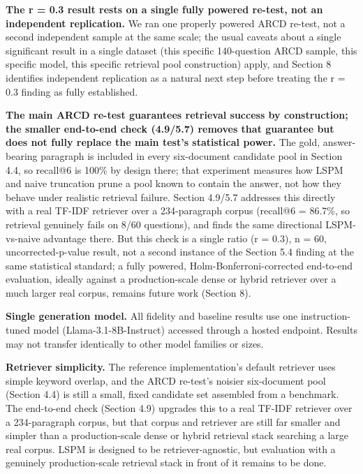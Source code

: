 \textbf{The r = 0.3 result rests on a single fully powered re-test, not an independent replication.} We ran one properly powered ARCD re-test, not a second independent sample at the same scale; the usual caveats about a single significant result in a single dataset (this specific 140-question ARCD sample, this specific model, this specific retrieval pool construction) apply, and Section 8 identifies independent replication as a natural next step before treating the r = 0.3 finding as fully established.

\textbf{The main ARCD re-test guarantees retrieval success by construction; the smaller end-to-end check (4.9/5.7) removes that guarantee but does not fully replace the main test's statistical power.} The gold, answer-bearing paragraph is included in every six-document candidate pool in Section 4.4, so recall@6 is 100\% by design there; that experiment measures how LSPM and naive truncation prune a pool known to contain the answer, not how they behave under realistic retrieval failure. Section 4.9/5.7 addresses this directly with a real TF-IDF retriever over a 234-paragraph corpus (recall@6 = 86.7\%, so retrieval genuinely fails on 8/60 questions), and finds the same directional LSPM-vs-naive advantage there. But this check is a single ratio (r = 0.3), n = 60, uncorrected-p-value result, not a second instance of the Section 5.4 finding at the same statistical standard; a fully powered, Holm-Bonferroni-corrected end-to-end evaluation, ideally against a production-scale dense or hybrid retriever over a much larger real corpus, remains future work (Section 8).

\textbf{Single generation model.} All fidelity and baseline results use one instruction-tuned model (Llama-3.1-8B-Instruct) accessed through a hosted endpoint. Results may not transfer identically to other model families or sizes.

\textbf{Retriever simplicity.} The reference implementation's default retriever uses simple keyword overlap, and the ARCD re-test's noisier six-document pool (Section 4.4) is still a small, fixed candidate set assembled from a benchmark. The end-to-end check (Section 4.9) upgrades this to a real TF-IDF retriever over a 234-paragraph corpus, but that corpus and retriever are still far smaller and simpler than a production-scale dense or hybrid retrieval stack searching a large real corpus. LSPM is designed to be retriever-agnostic, but evaluation with a genuinely production-scale retrieval stack in front of it remains to be done.

